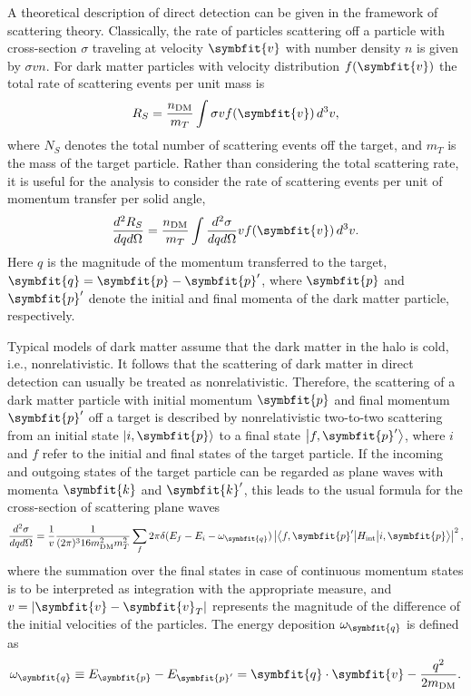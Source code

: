 \documentclass[b5paper, 10pt, twoside]{book}
\renewcommand{\vec}[1]{\symbfit{#1}}
\newcommand{\ddder}[3]{\frac{d^2#1}{d#2d#3}}
\newcommand{\difd}{\,d}
\newcommand{\ket}[1]{\left|#1\right\rangle}
\newcommand{\brakett}[3]{\left\langle#1\middle|#2\middle|#3\right\rangle}
\begin{document}
A theoretical description of direct detection can be given in the framework of scattering theory. Classically, the rate of particles scattering off a particle with cross-section $\sigma$ traveling at velocity $\vec{v}$ with number density $n$ is given by $\sigma vn$. For dark matter particles with velocity distribution $f(\vec{v})$ the total rate of scattering events per unit mass is
\begin{equation}
R_S=\frac{n_\text{DM}}{m_T}\int\sigma vf(\vec{v})\difd^3v,
\end{equation}
where $N_S$ denotes the total number of scattering events off the target, and $m_T$ is the mass of the target particle. Rather than considering the total scattering rate, it is useful for the analysis to consider the rate of scattering events per unit of momentum transfer per solid angle,
\begin{equation}
\ddder{R_S}{q}{\Omega}=\frac{n_\text{DM}}{m_T}\int\ddder{\sigma}{q}{\Omega}vf(\vec{v})\difd^3{v}.
\end{equation}
Here $q$ is the magnitude of the momentum transferred to the target, $\vec{q}=\vec{p}-\vec{p}'$, where $\vec{p}$ and $\vec{p}'$ denote the initial and final momenta of the dark matter particle, respectively.

Typical models of dark matter assume that the dark matter in the halo is cold, i.e., nonrelativistic. It follows that the scattering of dark matter in direct detection can usually be treated as nonrelativistic. Therefore, the scattering of a dark matter particle with initial momentum $\vec{p}$ and final momentum $\vec{p}'$ off a target is described by nonrelativistic two-to-two scattering from an initial state $\ket{i,\vec{p}}$ to a final state $\ket{f,\vec{p}'}$, where $i$ and $f$ refer to the initial and final states of the target particle. If the incoming and outgoing states of the target particle can be regarded as plane waves with momenta $\vec{k}$ and $\vec{k}'$, this leads to the usual formula for the cross-section of scattering plane waves
\begin{equation}
\ddder{\sigma}{q}{\Omega}=\frac{1}{v}\frac{1}{(2\pi)^3 16m_\text{DM}^2m_T^2}\sum_f2\pi\delta(E_f-E_i-\omega_{\vec{q}})\left|\brakett{f,\vec{p}'}{H_\text{int}}{i,\vec{p}}\right|^2,
\end{equation}
where the summation over the final states in case of continuous momentum states is to be interpreted as integration with the appropriate measure, and $v=|\vec{v}-\vec{v}_T|$ represents the magnitude of the difference of the initial velocities of the particles. The energy deposition $\omega_{\vec{q}}$ is defined as
\begin{equation}
\omega_{\vec{q}}\equiv E_{\vec{p}}-E_{\vec{p}'}=\vec{q}\cdot\vec{v}-\frac{q^2}{2m_\text{DM}}.
\end{equation}
\end{document}

